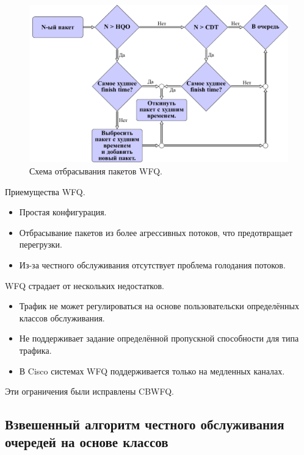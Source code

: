     \begin{figure}[ht!]
			\center
        \includegraphics{./pdfimages/fwfq_drop.pdf}
        \caption{Схема отбрасывания пакетов WFQ.}
		\label{pic:wfqdropalgo}
    \end{figure}

    Приемущества WFQ.
    \begin{itemize}
        \item Простая конфигурация.
        \item Отбрасывание пакетов из более агрессивных потоков, что предотвращает перегрузки.
		\item Из-за честного обслуживания отсутствует проблема голодания потоков.
    \end{itemize}

    WFQ страдает от нескольких недостатков.
    \begin{itemize}
        \item Трафик не может регулироваться на основе пользовательски определённых классов обслуживания.
        \item Не поддерживает задание определённой пропускной способности для типа трафика.
		\item В Cisco системах WFQ поддерживается только на медленных каналах.\cite{wfqdis}
    \end{itemize}

    Эти ограничения были исправлены CBWFQ.

    \subsection{Взвешенный алгоритм честного обслуживания очередей на основе классов}


